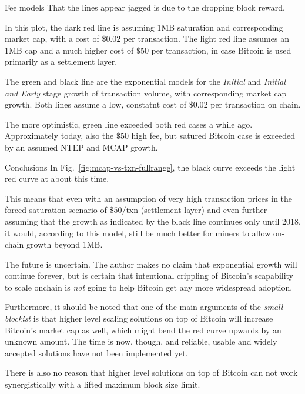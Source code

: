 \documentclass{article}
\begin{document}
\begin{section}{Fee models}
  That the lines appear jagged is due to the dropping block reward.
  
  In this plot, the dark red line is assuming 1MB saturation and corresponding
  market cap, with a cost of $\$0.02$ per transaction. The light red line
  assumes an 1MB cap and a much higher cost of $\$50$ per transaction, in case
  Bitcoin is used primarily as a settlement layer.
  
  The green and black line are the exponential models for the \emph{Initial}
  and \emph{Initial and Early} stage growth of transaction volume, with
  corresponding market cap growth. Both lines assume a low, constatnt cost of
  $\$0.02$ per transaction on chain.

  The more optimistic, green line exceeded both red cases a while
  ago. Approximately today, also the $\$50$ high fee, but satured Bitcoin case
  is exceeded by an assumed NTEP and MCAP growth.
\clearpage
\end{section}

\begin{section}{Conclusions}
  In Fig.~\ref{fig:mcap-vs-txn-fullrange}, the black curve exceeds the light
  red curve at about this time.
  
  This means that even with an assumption of very high transaction prices in the forced
  saturation scenario of $\$50/\mathrm{txn}$ (settlement layer) and even
  further assuming that the growth as indicated by the black line continues only until
  2018, it would, according to this model, still be much better for miners to
  allow on-chain growth beyond 1MB.

  The future is uncertain. The author makes no claim that exponential growth
  will continue forever, but is certain that intentional crippling of
  Bitcoin's scapability to scale onchain is \emph{not} going to help Bitcoin
  get any more widespread adoption.

  Furthermore, it should be noted that one of the main arguments of the
  \emph{small blockist} is that higher level scaling solutions on top of
  Bitcoin will increase Bitcoin's market cap as well, which might bend the red
  curve upwards by an unknown amount. The time is now, though, and reliable,
  usable and widely accepted solutions have not been implemented yet.

  There is also no reason that higher level solutions on top of Bitcoin can not
  work synergistically with a lifted maximum block size limit.
\clearpage
\end{section}
\end{document}
